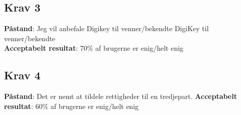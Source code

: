 \documentclass[12pt]{article}
\numberwithin{listing}{section}
\begin{document}
\subsection*{Krav 3}
\textbf{Påstand}: Jeg vil anbefale Digikey til venner/bekendte DigiKey til venner/bekendte\\
\textbf{Acceptabelt resultat}: 70\% af brugerne er enig/helt enig
\subsection*{Krav 4}
\textbf{Påstand}: Det er nemt at tildele rettigheder til en tredjepart.
\textbf{Acceptabelt resultat}: 60\% af brugerne er enig/helt enig
\end{document}
